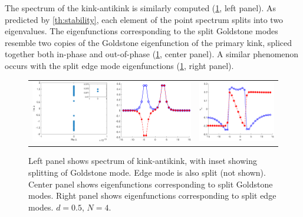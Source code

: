 \documentclass[12pt]{article}
\begin{document}
The spectrum of the kink-antikink is similarly computed (\cref{fig:kakspec}, left panel). As predicted by \cref{th:stability}, each element of the point spectrum splits into two eigenvalues. The eigenfunctions corresponding to the split Goldstone modes resemble two copies of the Goldstone eigenfunction of the primary kink, spliced together both in-phase and out-of-phase (\cref{fig:kakspec}, center panel). A similar phenomenon occurs with the split edge mode eigenfunctions (\cref{fig:kakspec}, right panel).

\begin{figure}[H]
	\begin{center}
	\begin{tabular}{ccc}
	\includegraphics[width=5cm]{kak50_8spec.eps}	&
	\includegraphics[width=5cm]{kak50_8goldstone.eps} &
	\includegraphics[width=5cm]{kak50_8edge.eps}
	\end{tabular}
	\end{center}
	\caption{Left panel shows spectrum of kink-antikink, with inset showing splitting of Goldstone mode. Edge mode is also split (not shown). Center panel shows eigenfunctions corresponding to split Goldstone modes. Right panel shows eigenfunctions corresponding to split edge modes. $d = 0.5$, $N = 4$.}
	\label{fig:kakspec}
\end{figure}
\end{document}
